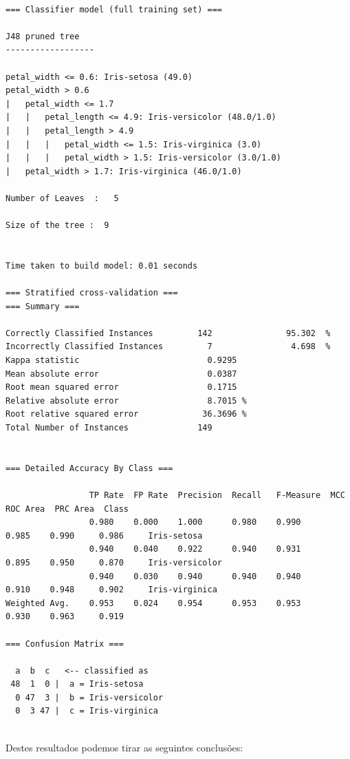\begin{lstlisting}[breaklines,frame=single]

=== Classifier model (full training set) ===

J48 pruned tree
------------------

petal_width <= 0.6: Iris-setosa (49.0)
petal_width > 0.6
|   petal_width <= 1.7
|   |   petal_length <= 4.9: Iris-versicolor (48.0/1.0)
|   |   petal_length > 4.9
|   |   |   petal_width <= 1.5: Iris-virginica (3.0)
|   |   |   petal_width > 1.5: Iris-versicolor (3.0/1.0)
|   petal_width > 1.7: Iris-virginica (46.0/1.0)

Number of Leaves  :   5

Size of the tree :  9


Time taken to build model: 0.01 seconds

=== Stratified cross-validation ===
=== Summary ===

Correctly Classified Instances         142               95.302  %
Incorrectly Classified Instances         7                4.698  %
Kappa statistic                          0.9295
Mean absolute error                      0.0387
Root mean squared error                  0.1715
Relative absolute error                  8.7015 %
Root relative squared error             36.3696 %
Total Number of Instances              149     


=== Detailed Accuracy By Class ===

                 TP Rate  FP Rate  Precision  Recall   F-Measure  MCC      ROC Area  PRC Area  Class
                 0.980    0.000    1.000      0.980    0.990      0.985    0.990     0.986     Iris-setosa
                 0.940    0.040    0.922      0.940    0.931      0.895    0.950     0.870     Iris-versicolor
                 0.940    0.030    0.940      0.940    0.940      0.910    0.948     0.902     Iris-virginica
Weighted Avg.    0.953    0.024    0.954      0.953    0.953      0.930    0.963     0.919     

=== Confusion Matrix ===

  a  b  c   <-- classified as
 48  1  0 |  a = Iris-setosa
  0 47  3 |  b = Iris-versicolor
  0  3 47 |  c = Iris-virginica


\end{lstlisting}

Destes resultados podemos tirar as seguintes conclusões:

